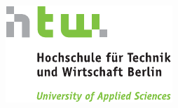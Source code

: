 \begin{titlepage}
\begin{center}
\begin{minipage}{0.2\textwidth}
\includegraphics[viewport=0 0 60 60]{HTW_Logo_4c.pdf}

\end{minipage}

\end{center}
\end{titlepage}